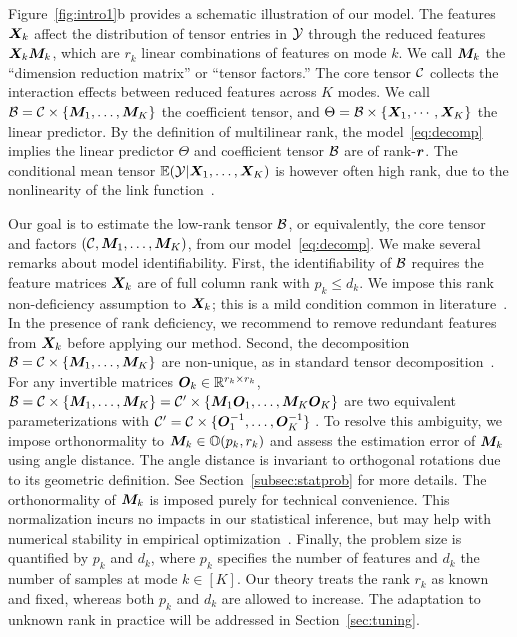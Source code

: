 \documentclass[12pt]{article}
\theoremstyle{definition}
\theoremstyle{definition}
\begin{document}
Figure~\ref{fig:intro1}b provides a schematic illustration of our model. The features $\bm X_k$ affect the distribution of tensor entries in $\mathcal{Y}$ through the reduced features $\bm X_k\bm M_k$, which are $r_k$ linear combinations of features on mode $k$. We call $\bm M_k$ the ``dimension reduction matrix'' or ``tensor factors.'' The core tensor $\mathcal{C}$ collects the interaction effects between reduced features across $K$ modes. We call $\mathcal{B}=\mathcal{C}\times\{\bm M_1,\ldots,\bm M_K\}$ the coefficient tensor, and $\Theta=\mathcal{B}\times\{\bm X_1,\cdots,\bm X_K\}$ the linear predictor. By the definition of multilinear rank, the model~\eqref{eq:decomp} implies the linear predictor $\Theta$ and coefficient tensor $\mathcal{B}$ are of rank-$\bm{r}$. The conditional mean tensor $\mathbb{E}(\mathcal{Y}|\bm X_1,\ldots,\bm X_K)$ is however often high rank, due to the nonlinearity of the link function~\citep{lee2021beyond}. 

Our goal is to estimate the low-rank tensor $\mathcal{B}$, or equivalently, the core tensor and factors $(\mathcal{C}, \bm M_1,\ldots,\bm M_K)$, from our model~\eqref{eq:decomp}. {\color{blue}We make several remarks about model identifiability. First, the identifiability of $\mathcal{B}$ requires the feature matrices $\bm X_k$ are of full column rank with $p_k\leq d_k$. We impose this rank non-deficiency assumption to $\bm X_k$; this is a mild condition common in literature~\citep{lock2018supervised, li2017parsimonious, li2020generalized}. In the presence of rank deficiency, we recommend to remove redundant features from $\bm X_k$ before applying our method. Second, the decomposition $\mathcal{B} = \mathcal{C}\times\{\bm M_1,\ldots,\bm M_K\}$ are non-unique, as in standard tensor decomposition~\citep{kolda2009tensor}. For any invertible matrices $\bm{O}_k\in\mathbb{R}^{r_k\times r_k}$, $\mathcal{B}=\mathcal{C}\times\{\bm M_1,\ldots,\bm M_K\}=\mathcal{C}'\times\{\bm M_1\bm{O}_1,\ldots,\bm M_K\bm{O}_K\}$ are two equivalent parameterizations with $\mathcal{C}'=\mathcal{C}\times\{\bm{O}^{-1}_1,\ldots,\bm{O}^{-1}_K\}$ . To resolve this ambiguity, we impose orthonormality to $\bm M_k\in\mathbb{O}(p_k,r_k)$ and assess the estimation error of $\bm M_k$ using angle distance. The angle distance is invariant to orthogonal rotations due to its geometric definition. See Section~\ref{subsec:statprob} for more details. The orthonormality of $\bm M_k$ is imposed purely for technical convenience. This normalization incurs no impacts in our statistical inference, but may help with numerical stability in empirical optimization~\citep{de2000multilinear, kolda2009tensor}.} Finally, the problem size is quantified by $p_k$ and $d_k$, where $p_k$ specifies the number of features and $d_k$ the number of samples at mode $k\in[K]$. Our theory treats the rank $r_k$ as known and fixed, whereas both $p_k$ and $d_k$ are allowed to increase. The adaptation to unknown rank in practice will be addressed in Section~\ref{sec:tuning}. 
\end{document}
